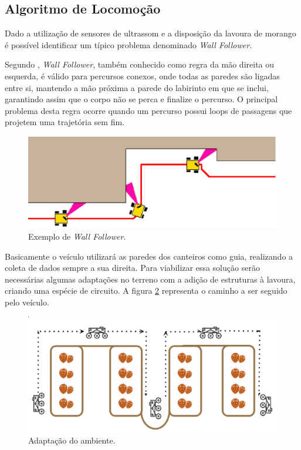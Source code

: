   \subsection{Algoritmo de Locomoção}
    Dado a utilização de sensores de ultrassom e a disposição da lavoura de morango
    é possível identificar um típico problema denominado \textit{Wall Follower}.

    Segundo \cite{huang2009}, \textit{Wall Follower},
    também conhecido como regra da mão direita ou esquerda, é válido para percursos conexos, onde todas as paredes são ligadas entre si, mantendo a mão próxima a parede do labirinto em
    que se inclui, garantindo assim que o corpo não se perca e finalize
    o percurso. O principal problema desta regra ocorre quando um percurso
    possui loops de passagens que projetem uma trajetória sem fim.

    \begin{figure}[!htbp]
    \begin{center}
    \includegraphics[width=.7\textwidth]{figuras/wallfollower.eps}
    \caption{\label{fig:wallfollower}Exemplo de \textit{Wall Follower}.}
    \end{center}
    \end{figure}

    \vfill
    \pagebreak

    Basicamente o veículo utilizará as paredes dos canteiros como guia, realizando a
    coleta de dados sempre a sua direita. Para viabilizar essa solução serão necessárias algumas adaptações no terreno com a adição de estruturas à lavoura, criando uma espécie de circuito. A figura \ref{fig:ambientadapt} representa o caminho a ser seguido pelo veículo.

    \begin{figure}[!htbp]
    \begin{center}
    \includegraphics[width=.7\textwidth]{figuras/adapt.eps}
    \caption{\label{fig:ambientadapt}Adaptação do ambiente.}
    \end{center}
    \end{figure}


